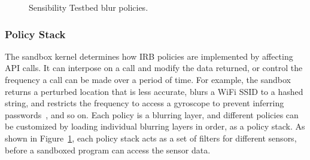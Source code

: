 \begin{figure}
\caption{\small Sensibility Testbed blur policies. 
\label{fig-blur}}
\end{figure}

\subsubsection{Policy Stack}
The sandbox kernel determines how IRB policies are implemented by affecting API calls. It can
interpose on a call and modify the data returned, or control the frequency a call can be made over
a period of time. 
%
For example, the sandbox returns a perturbed location that is less accurate, 
blurs a WiFi SSID to a hashed string, and restricts the frequency to access a
gyroscope to prevent inferring passwords~\cite{michalevsky2014gyrophone}, and so on. 
Each policy is a blurring layer, and different policies can be customized 
by loading individual blurring layers in order, as a policy stack. 
As shown in Figure~\ref{fig-blur}, each policy stack acts as a set 
of filters for different sensors, before a sandboxed program can
access the sensor data.

